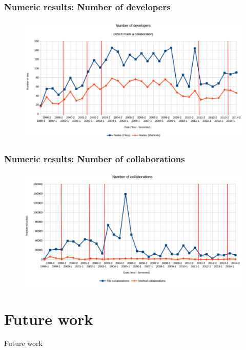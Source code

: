 \documentclass{beamer}
\begin{document}
\begin{frame}
\frametitle{Numeric results: Number of developers}
\begin{figure}
\includegraphics[scale=0.32]{chart1.png}
\label{fig:chartdev1}
\end{figure}
\end{frame}

\begin{frame}
\frametitle{Numeric results: Number of collaborations}
\begin{figure}
\includegraphics[scale=0.32]{chart2.png}
\label{fig:chartdev2}
\end{figure}
\end{frame}

\section{Future work}

\begin{frame}
\Huge{\centerline{Future work}}
\end{frame}
\end{document}
